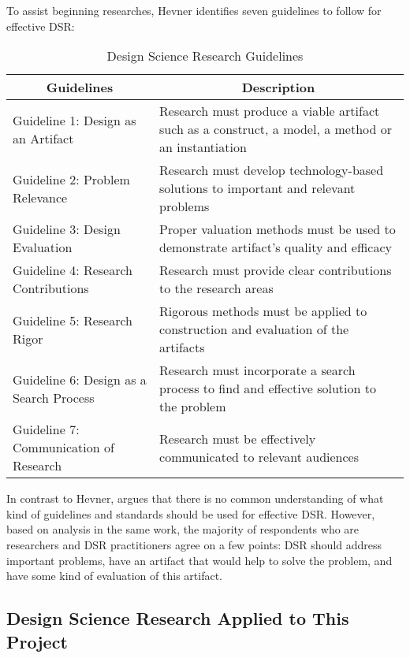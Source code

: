 To assist beginning researches, Hevner \citeyearpar{Hevner2004} identifies seven
guidelines to follow for effective DSR:

\begin{table}[htb]
  \caption[Design Science Research Guidelines]{Design Science Research
  Guidelines \citep{Hevner2004}}
  \begin{center}
    \begin{tabular}{| l | p{6.5cm} |}
    \hline
     \multicolumn{1}{|c|}{\textbf{Guidelines}} &
     \multicolumn{1}{c|}{\textbf{Description}} \\
     \hline
     Guideline 1: Design as an Artifact & Research must produce a viable
    artifact such as a construct, a model, a method or an instantiation \\ \hline
     Guideline 2: Problem Relevance & Research must develop technology-based
     solutions to important and relevant problems \\ \hline 
     Guideline 3: Design Evaluation & Proper valuation methods must be used to
     demonstrate artifact's quality and efficacy \\ \hline 
     Guideline 4: Research Contributions & Research must provide clear
     contributions to the research areas \\ \hline 
     Guideline 5: Research Rigor & Rigorous methods must be applied to
     construction and evaluation of the artifacts \\ \hline 
     Guideline 6: Design as a Search Process & Research must incorporate a
     search process to find and effective solution to the problem \\ \hline
     Guideline 7: Communication of Research & Research must be effectively
     communicated to relevant audiences \\ \hline
    \end{tabular}
  \end{center}
\end{table}

In contrast to Hevner, \citet{Venable2010} argues that there is no common
understanding of what kind of guidelines and standards should be used for
effective DSR. However, based on analysis in the same work, the majority of
respondents who are researchers and DSR practitioners agree on a few points: DSR
should address important problems, have an artifact that would help to solve the
problem, and have some kind of evaluation of this artifact.

\subsection{Design Science Research Applied to This Project}

